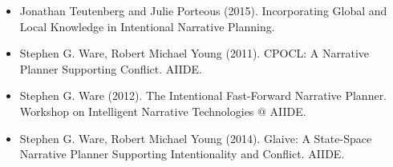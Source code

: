 \documentclass[utf8,13pt]{beamer}
\begin{document}
\begin{frame}
  \footnotesize
  \begin{itemize}
  \item Jonathan Teutenberg and Julie Porteous (2015).
    Incorporating Global and Local Knowledge in Intentional Narrative
    Planning.
  \item Stephen G. Ware, Robert Michael Young (2011).
    CPOCL: A Narrative Planner Supporting Conflict. AIIDE.
  \item Stephen G. Ware (2012).
    The Intentional Fast-Forward Narrative Planner.
    Workshop on Intelligent Narrative Technologies @ AIIDE.
  \item Stephen G. Ware, Robert Michael Young (2014).
    Glaive: A State-Space Narrative Planner Supporting Intentionality
    and Conflict. AIIDE.
  \end{itemize}
\end{frame}
\end{document}
